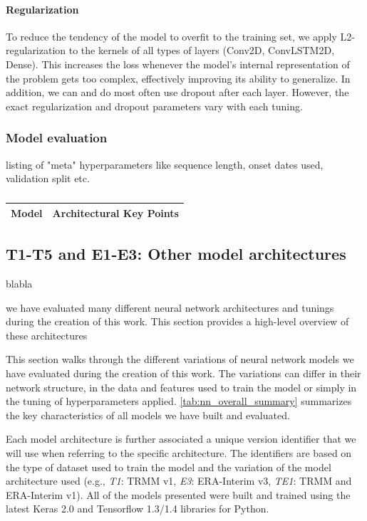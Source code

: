 \paragraph{Regularization} To reduce the tendency of the model to overfit to the training set, we apply L2-regularization to the kernels of all types of layers (Conv2D, ConvLSTM2D, Dense). This increases the loss whenever the model's internal representation of the problem gets too complex, effectively improving its ability to generalize. In addition, we can and do most often use dropout after each layer. However, the exact regularization and dropout parameters vary with each tuning.

\subsubsection{Model evaluation}
listing of "meta" hyperparameters like sequence length, onset dates used, validation split etc.

\begin{table}[h]
  \begin{tabularx}{\linewidth}{|c|X|}
    \hline
    Model & Architectural Key Points \\
    \hline

    \hline
  \end{tabularx}
  \caption{}
  \label{tab:evaluation_schemes}
\end{table}



\subsection{T1-T5 and E1-E3: Other model architectures}
blabla


we have evaluated many different neural network architectures and tunings during the creation of this work. This section provides a high-level overview of these architectures


This section walks through the different variations of neural network models we have evaluated during the creation of this work. The variations can differ in their network structure, in the data and features used to train the model or simply in the tuning of hyperparameters applied. \cref{tab:nn_overall_summary} summarizes the key characteristics of all models we have built and evaluated.

Each model architecture is further associated a unique version identifier that we will use when referring to the specific architecture. The identifiers are based on the type of dataset used to train the model and the variation of the model architecture used (e.g., \textit{T1}: TRMM v1, \textit{E3}: ERA-Interim v3, \textit{TE1}: TRMM and ERA-Interim v1). All of the models presented were built and trained using the latest Keras 2.0 and Tensorflow 1.3/1.4 libraries for Python.

